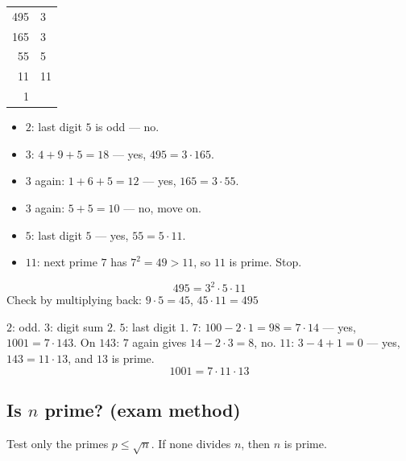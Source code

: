 \documentclass{fkt-notes}
\theoremstyle{definition}
\begin{document}
\begin{example}[$495$]
  \leavevmode\par\noindent
  \begin{minipage}[t]{0.25\textwidth}
    \vspace{0pt}
    \begin{tabular}{r|l}
      495 & 3  \\
      165 & 3  \\
      55  & 5  \\
      11  & 11 \\
      1   &
    \end{tabular}
  \end{minipage}
  \begin{minipage}[t]{0.7\textwidth}
    \vspace{0pt}
    \begin{itemize}[nosep]
      \item $2$: last digit $5$ is odd --- no.
      \item $3$: $4 + 9 + 5 = 18$ --- yes, $495 = 3 \cdot 165$.
      \item $3$ again: $1 + 6 + 5 = 12$ --- yes, $165 = 3 \cdot 55$.
      \item $3$ again: $5 + 5 = 10$ --- no, move on.
      \item $5$: last digit $5$ --- yes, $55 = 5 \cdot 11$.
      \item $11$: next prime $7$ has $7^2 = 49 > 11$, so $11$ is prime. Stop.
    \end{itemize}
  \end{minipage}
  \[
    495 = 3^2 \cdot 5 \cdot 11
  \]
  Check by multiplying back: $9 \cdot 5 = 45$, $45 \cdot 11 = 495$ \checkmark
\end{example}

\begin{example}[$1001$]
  $2$: odd. $3$: digit sum $2$. $5$: last digit $1$. $7$: $100 - 2\cdot 1
    = 98 = 7 \cdot 14$ --- yes, $1001 = 7 \cdot 143$. On $143$: $7$ again
  gives $14 - 2 \cdot 3 = 8$, no. $11$: $3 - 4 + 1 = 0$ --- yes,
  $143 = 11 \cdot 13$, and $13$ is prime.
  \[
    1001 = 7 \cdot 11 \cdot 13
  \]
\end{example}

\subsection{\texorpdfstring{Is $n$ prime? (exam method)}{Is n prime?}}
Test only the primes $p \leq \sqrt{n}$. If none divides $n$, then $n$ is
prime.
\end{document}

